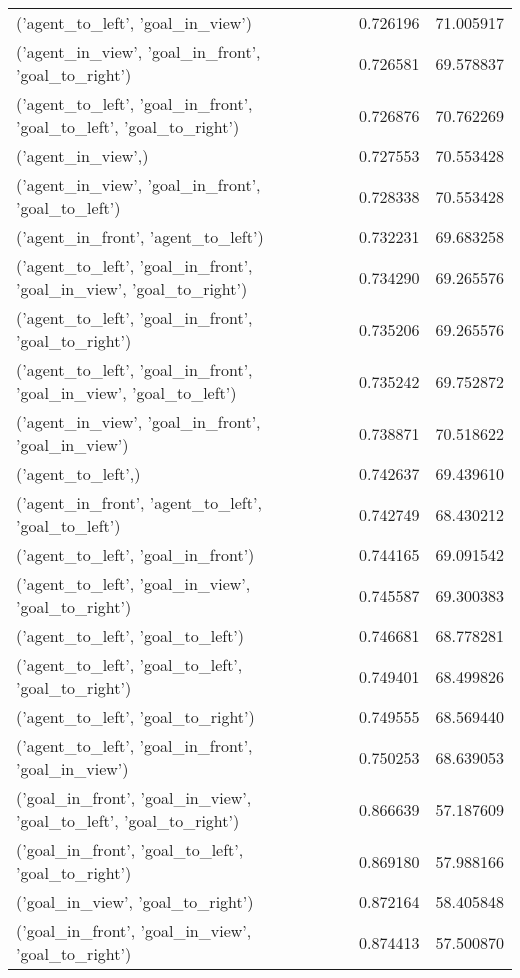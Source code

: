 \begin{tabular}{lrr}
('agent\_to\_left', 'goal\_in\_view') & 0.726196 & 71.005917 \\
('agent\_in\_view', 'goal\_in\_front', 'goal\_to\_right') & 0.726581 & 69.578837 \\
('agent\_to\_left', 'goal\_in\_front', 'goal\_to\_left', 'goal\_to\_right') & 0.726876 & 70.762269 \\
('agent\_in\_view',) & 0.727553 & 70.553428 \\
('agent\_in\_view', 'goal\_in\_front', 'goal\_to\_left') & 0.728338 & 70.553428 \\
('agent\_in\_front', 'agent\_to\_left') & 0.732231 & 69.683258 \\
('agent\_to\_left', 'goal\_in\_front', 'goal\_in\_view', 'goal\_to\_right') & 0.734290 & 69.265576 \\
('agent\_to\_left', 'goal\_in\_front', 'goal\_to\_right') & 0.735206 & 69.265576 \\
('agent\_to\_left', 'goal\_in\_front', 'goal\_in\_view', 'goal\_to\_left') & 0.735242 & 69.752872 \\
('agent\_in\_view', 'goal\_in\_front', 'goal\_in\_view') & 0.738871 & 70.518622 \\
('agent\_to\_left',) & 0.742637 & 69.439610 \\
('agent\_in\_front', 'agent\_to\_left', 'goal\_to\_left') & 0.742749 & 68.430212 \\
('agent\_to\_left', 'goal\_in\_front') & 0.744165 & 69.091542 \\
('agent\_to\_left', 'goal\_in\_view', 'goal\_to\_right') & 0.745587 & 69.300383 \\
('agent\_to\_left', 'goal\_to\_left') & 0.746681 & 68.778281 \\
('agent\_to\_left', 'goal\_to\_left', 'goal\_to\_right') & 0.749401 & 68.499826 \\
('agent\_to\_left', 'goal\_to\_right') & 0.749555 & 68.569440 \\
('agent\_to\_left', 'goal\_in\_front', 'goal\_in\_view') & 0.750253 & 68.639053 \\
('goal\_in\_front', 'goal\_in\_view', 'goal\_to\_left', 'goal\_to\_right') & 0.866639 & 57.187609 \\
('goal\_in\_front', 'goal\_to\_left', 'goal\_to\_right') & 0.869180 & 57.988166 \\
('goal\_in\_view', 'goal\_to\_right') & 0.872164 & 58.405848 \\
('goal\_in\_front', 'goal\_in\_view', 'goal\_to\_right') & 0.874413 & 57.500870 \\

\end{tabular}
